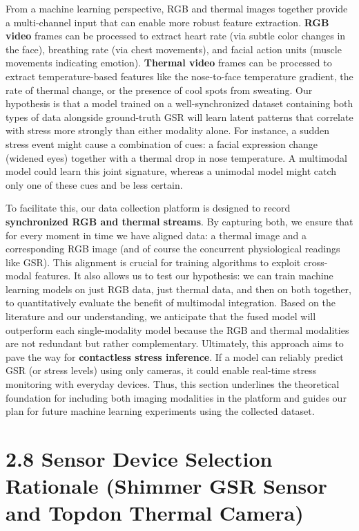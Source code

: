 From a machine learning perspective, RGB and thermal images together provide a multi-channel input that can enable more robust feature extraction. \textbf{RGB video} frames can be processed to extract heart rate (via subtle color changes in the face), breathing rate (via chest movements), and facial action units (muscle movements indicating emotion). \textbf{Thermal video} frames can be processed to extract temperature-based features like the nose-to-face temperature gradient, the rate of thermal change, or the presence of cool spots from sweating. Our hypothesis is that a model trained on a well-synchronized dataset containing both types of data alongside ground-truth GSR will learn latent patterns that correlate with stress more strongly than either modality alone. For instance, a sudden stress event might cause a combination of cues: a facial expression change (widened eyes) together with a thermal drop in nose temperature. A multimodal model could learn this joint signature, whereas a unimodal model might catch only one of these cues and be less certain.

To facilitate this, our data collection platform is designed to record \textbf{synchronized RGB and thermal streams}. By capturing both, we ensure that for every moment in time we have aligned data: a thermal image and a corresponding RGB image (and of course the concurrent physiological readings like GSR). This alignment is crucial for training algorithms to exploit cross-modal features. It also allows us to test our hypothesis: we can train machine learning models on just RGB data, just thermal data, and then on both together, to quantitatively evaluate the benefit of multimodal integration. Based on the literature and our understanding, we anticipate that the fused model will outperform each single-modality model because the RGB and thermal modalities are not redundant but rather complementary. Ultimately, this approach aims to pave the way for \textbf{contactless stress inference}. If a model can reliably predict GSR (or stress levels) using only cameras, it could enable real-time stress monitoring with everyday devices. Thus, this section underlines the theoretical foundation for including both imaging modalities in the platform and guides our plan for future machine learning experiments using the collected dataset.

\section{2.8 Sensor Device Selection Rationale (Shimmer GSR Sensor and Topdon Thermal Camera)}

